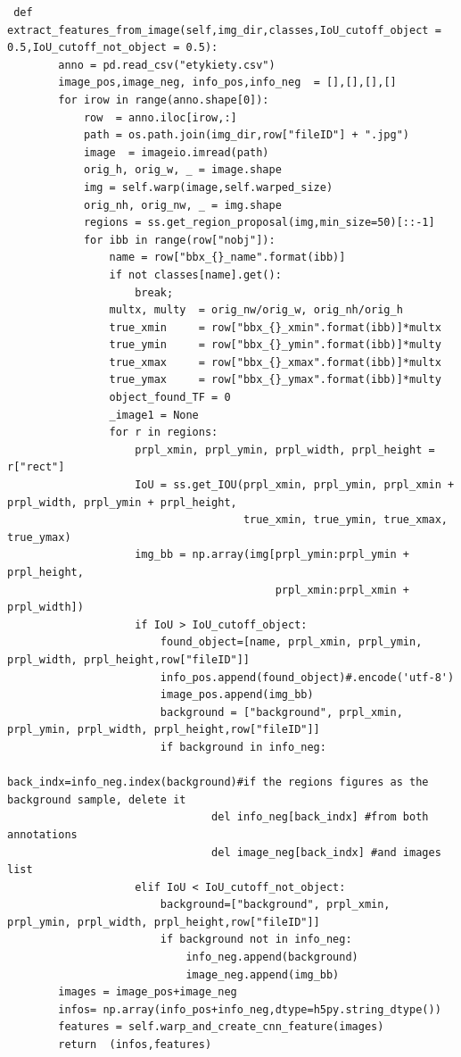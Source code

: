 \documentclass[a4paper,twoside,12pt]{book}
\begin{document}
{\begin{appendices}
\begin{lstlisting}
 def extract_features_from_image(self,img_dir,classes,IoU_cutoff_object = 0.5,IoU_cutoff_not_object = 0.5):        
        anno = pd.read_csv("etykiety.csv")        
        image_pos,image_neg, info_pos,info_neg  = [],[],[],[]
        for irow in range(anno.shape[0]):
            row  = anno.iloc[irow,:]
            path = os.path.join(img_dir,row["fileID"] + ".jpg")
            image  = imageio.imread(path)
            orig_h, orig_w, _ = image.shape          
            img = self.warp(image,self.warped_size)
            orig_nh, orig_nw, _ = img.shape
            regions = ss.get_region_proposal(img,min_size=50)[::-1]
            for ibb in range(row["nobj"]): 
                name = row["bbx_{}_name".format(ibb)]
                if not classes[name].get():
                    break;       
                multx, multy  = orig_nw/orig_w, orig_nh/orig_h 
                true_xmin     = row["bbx_{}_xmin".format(ibb)]*multx
                true_ymin     = row["bbx_{}_ymin".format(ibb)]*multy
                true_xmax     = row["bbx_{}_xmax".format(ibb)]*multx
                true_ymax     = row["bbx_{}_ymax".format(ibb)]*multy       
                object_found_TF = 0
                _image1 = None
                for r in regions:                    
                    prpl_xmin, prpl_ymin, prpl_width, prpl_height = r["rect"]
                    IoU = ss.get_IOU(prpl_xmin, prpl_ymin, prpl_xmin + prpl_width, prpl_ymin + prpl_height,
                                     true_xmin, true_ymin, true_xmax, true_ymax)
                    img_bb = np.array(img[prpl_ymin:prpl_ymin + prpl_height,
                                          prpl_xmin:prpl_xmin + prpl_width])            
                    if IoU > IoU_cutoff_object:
                        found_object=[name, prpl_xmin, prpl_ymin, prpl_width, prpl_height,row["fileID"]]
                        info_pos.append(found_object)#.encode('utf-8')
                        image_pos.append(img_bb)
                        background = ["background", prpl_xmin, prpl_ymin, prpl_width, prpl_height,row["fileID"]]
                        if background in info_neg: 
                                back_indx=info_neg.index(background)#if the regions figures as the background sample, delete it
                                del info_neg[back_indx] #from both annotations
                                del image_neg[back_indx] #and images list                                                                                    
                    elif IoU < IoU_cutoff_not_object:
                        background=["background", prpl_xmin, prpl_ymin, prpl_width, prpl_height,row["fileID"]]
                        if background not in info_neg:
                            info_neg.append(background)
                            image_neg.append(img_bb)
        images = image_pos+image_neg
        infos= np.array(info_pos+info_neg,dtype=h5py.string_dtype())
        features = self.warp_and_create_cnn_feature(images)
        return  (infos,features)
       

\end{lstlisting}
\end{appendices}}
\end{document}
